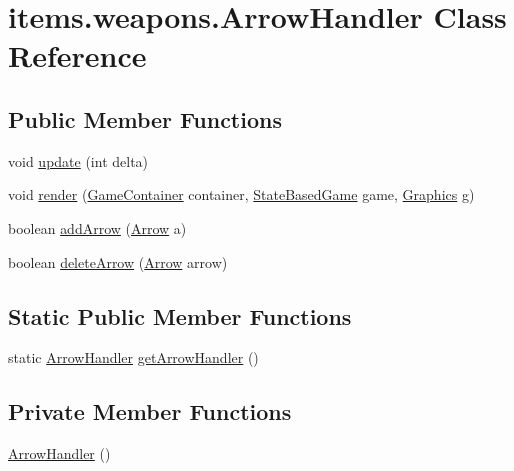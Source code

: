\hypertarget{classitems_1_1weapons_1_1_arrow_handler}{}\section{items.\+weapons.\+Arrow\+Handler Class Reference}
\label{classitems_1_1weapons_1_1_arrow_handler}
\subsection*{Public Member Functions}
\begin{DoxyCompactItemize}
\item 
void \mbox{\hyperlink{classitems_1_1weapons_1_1_arrow_handler_a64a0233c91c8aef9289012c67bdf6874}{update}} (int delta)
\item 
void \mbox{\hyperlink{classitems_1_1weapons_1_1_arrow_handler_abe0324e6596b718769e45b8165c25673}{render}} (\mbox{\hyperlink{classorg_1_1newdawn_1_1slick_1_1_game_container}{Game\+Container}} container, \mbox{\hyperlink{classorg_1_1newdawn_1_1slick_1_1state_1_1_state_based_game}{State\+Based\+Game}} game, \mbox{\hyperlink{classorg_1_1newdawn_1_1slick_1_1_graphics}{Graphics}} g)
\item 
boolean \mbox{\hyperlink{classitems_1_1weapons_1_1_arrow_handler_af197702f581022b65e7f0ded40f18758}{add\+Arrow}} (\mbox{\hyperlink{classitems_1_1weapons_1_1_arrow}{Arrow}} a)
\item 
boolean \mbox{\hyperlink{classitems_1_1weapons_1_1_arrow_handler_ab7e4dce0dc3cd385a870fe54ca1cabf1}{delete\+Arrow}} (\mbox{\hyperlink{classitems_1_1weapons_1_1_arrow}{Arrow}} arrow)
\end{DoxyCompactItemize}
\subsection*{Static Public Member Functions}
\begin{DoxyCompactItemize}
\item 
static \mbox{\hyperlink{classitems_1_1weapons_1_1_arrow_handler}{Arrow\+Handler}} \mbox{\hyperlink{classitems_1_1weapons_1_1_arrow_handler_a67870bc30237b05a43008c330ec748ce}{get\+Arrow\+Handler}} ()
\end{DoxyCompactItemize}
\subsection*{Private Member Functions}
\begin{DoxyCompactItemize}
\item 
\mbox{\hyperlink{classitems_1_1weapons_1_1_arrow_handler_a8dfa1e68464bdd4eb03007cfc9412948}{Arrow\+Handler}} ()
\end{DoxyCompactItemize}
